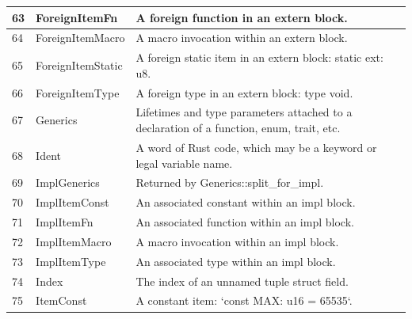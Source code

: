 \begin{longtable}{| p{} | p{} | p{} |}
63    & ForeignItemFn                  & A foreign function in an extern block.                                                                         \\ \hline
64    & ForeignItemMacro               & A macro invocation within an extern block.                                                                     \\ \hline
65    & ForeignItemStatic              & A foreign static item in an extern block: static ext: u8.                                                      \\ \hline
66    & ForeignItemType                & A foreign type in an extern block: type void.                                                                  \\ \hline
67    & Generics                       & Lifetimes and type parameters attached to a declaration of a function, enum, trait, etc.                       \\ \hline
68    & Ident                          & A word of Rust code, which may be a keyword or legal variable name.                                            \\ \hline
69    & ImplGenerics                   & Returned by Generics::split\_for\_impl.                                                                          \\ \hline
70    & ImplItemConst                  & An associated constant within an impl block.                                                                   \\ \hline
71    & ImplItemFn                     & An associated function within an impl block.                                                                   \\ \hline
72    & ImplItemMacro                  & A macro invocation within an impl block.                                                                       \\ \hline
73    & ImplItemType                   & An associated type within an impl block.                                                                       \\ \hline
74    & Index                          & The index of an unnamed tuple struct field.                                                                    \\ \hline
75    & ItemConst                      & A constant item: `const MAX: u16 = 65535`.                                                                     \\ \hline

\end{longtable}
